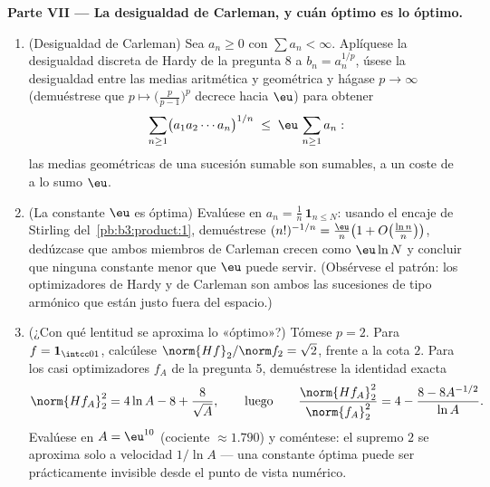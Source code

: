 \begin{problem}
\medskip
\noindent\textbf{Parte VII --- La desigualdad de Carleman, y cuán óptimo
es lo óptimo.}
\begin{enumerate}[resume]
  \item (Desigualdad de Carleman) Sea $a_n \geq 0$ con $\sum
        a_n < \infty$. Aplíquese la desigualdad discreta de Hardy de la
  pregunta 8 a $b_n = a_n^{1/p}$, úsese la desigualdad entre las medias
  aritmética y geométrica y hágase $p \to
        \infty$ (demuéstrese que $p \mapsto
        \bigl(\frac p{p-1}\bigr)^p$ decrece hacia $\eu$) para obtener
        \[
        \sum_{n\geq1}\bigl(a_1a_2\cdots a_n\bigr)^{1/n}
        \;\leq\; \eu\,\sum_{n\geq1}a_n :
        \]
        las medias geométricas de una sucesión sumable son sumables, a
        un coste de a lo sumo $\eu$. \item (La constante $\eu$ es
        óptima) Evalúese en $a_n =
        \frac1n\,\mathbf 1_{n\leq N}$: usando el encaje de Stirling
        del~\cref{pb:b3:product:1}, demuéstrese
        $(n!)^{-1/n} = \frac\eu n\bigl(1 +
        O\bigl(\frac{\ln n}n\bigr)\bigr)$, dedúzcase que ambos miembros
        de Carleman crecen como $\eu\ln N$ y concluir que ninguna
        constante menor que $\eu$ puede servir. (Obsérvese el patrón:
        los optimizadores de Hardy y de Carleman son ambos las
        sucesiones de tipo armónico que están justo fuera del espacio.)
        \item (¿Con qué lentitud se aproxima lo «óptimo»?) Tómese
        $p = 2$. Para $f = \mathbf 1_{\intcc01}$, calcúlese
        $\norm{Hf}_2/\norm f_2 = \sqrt2$, frente a la cota $2$. Para los
        casi optimizadores $f_A$ de la pregunta 5, demuéstrese la
        identidad exacta
        \[
        \norm{Hf_A}_2^2 = 4\ln A - 8 + \frac{8}{\sqrt A},
        \qquad\text{luego}\qquad
        \frac{\norm{Hf_A}_2^2}{\norm{f_A}_2^2}
        = 4 - \frac{8 - 8A^{-1/2}}{\ln A} .
        \]
        Evalúese en $A = \eu^{10}$ (cociente $\approx 1.790$) y
        coméntese: el supremo $2$ se aproxima solo a velocidad $1/\ln A$
        --- una constante óptima puede ser prácticamente invisible desde
        el punto de vista numérico.
\end{enumerate}
\end{problem}
